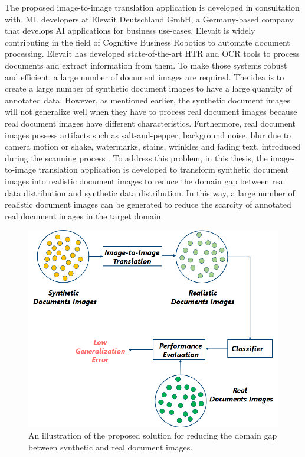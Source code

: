 The proposed image-to-image translation application is developed in consultation with, \ac{ML} developers at Elevait Deutschland GmbH, a Germany-based company that develops \ac{AI} applications for business use-cases. Elevait is widely contributing in the field of Cognitive Business Robotics \cite{Metta2012} to automate document processing. Elevait has developed state-of-the-art \ac{HTR} and \ac{OCR} tools to process documents and extract information from them. To make those systems robust and efficient, a large number of document images are required. The idea is to create a large number of synthetic document images to have a large quantity of annotated data. However, as mentioned earlier, the synthetic document images will not generalize well when they have to process real document images because real document images have different characteristics. Furthermore, real document images possess artifacts such as salt-and-pepper, background noise, blur due to camera motion or shake, watermarks, stains, wrinkles and fading text, introduced during the scanning process \cite{sharma2019learning}. To address this problem, in this thesis, the image-to-image translation application is developed to transform synthetic document images into realistic document images to reduce the domain gap between real data distribution and synthetic data distribution. In this way, a large number of realistic document images can be generated to reduce the scarcity of annotated real document images in the target domain.

\begin{figure}[H]
        \begin{center}
	    \includegraphics[scale=0.70]{images/Introduction/ProposedSolution.png}
	    \caption[An illustration of the proposed solution for reducing the domain gap between synthetic and real document images.]{An illustration of the proposed solution for reducing the domain gap between synthetic and real document images.}
	    \label{fig:ProposedSolution}
	    \end{center}
\end{figure}

